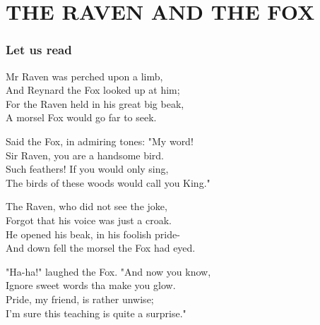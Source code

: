 \chapter{THE RAVEN AND THE FOX}
\subsection{Let us read}
Mr Raven was perched upon a limb,\\
And Reynard the Fox looked up at him;\\
For the Raven held in his great big beak,\\
A morsel Fox would go far to seek.
\par
\vspace{0.1in}
Said the Fox, in admiring tones: "My word!\\
Sir Raven, you are a handsome bird.\\
Such feathers! If you would only sing,\\
The birds of these woods would call you King."
\par
\vspace{0.1in}
The Raven, who did not see the joke,\\
Forgot that his voice was just a croak.\\
He opened his beak, in his foolish pride-\\
And down fell the morsel the Fox had eyed.
\par
\vspace{0.1in}
"Ha-ha!" laughed the Fox. "And now you know,\\
Ignore sweet words tha make you glow.\\
Pride, my friend, is rather unwise;\\
I'm sure this teaching is quite a surprise."